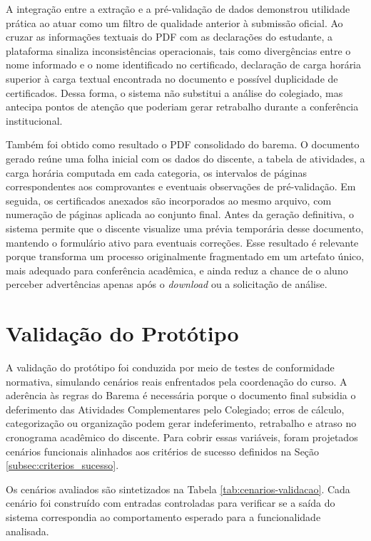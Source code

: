 A integração entre a extração e a pré-validação de dados demonstrou utilidade prática ao atuar como um filtro de qualidade anterior à submissão oficial. Ao cruzar as informações textuais do PDF com as declarações do estudante, a plataforma sinaliza inconsistências operacionais, tais como divergências entre o nome informado e o nome identificado no certificado, declaração de carga horária superior à carga textual encontrada no documento e possível duplicidade de certificados. Dessa forma, o sistema não substitui a análise do colegiado, mas antecipa pontos de atenção que poderiam gerar retrabalho durante a conferência institucional.


Também foi obtido como resultado o PDF consolidado do barema. O documento gerado reúne uma folha inicial com os dados do discente, a tabela de atividades, a carga horária computada em cada categoria, os intervalos de páginas correspondentes aos comprovantes e eventuais observações de pré-validação. Em seguida, os certificados anexados são incorporados ao mesmo arquivo, com numeração de páginas aplicada ao conjunto final. Antes da geração definitiva, o sistema permite que o discente visualize uma prévia temporária desse documento, mantendo o formulário ativo para eventuais correções. Esse resultado é relevante porque transforma um processo originalmente fragmentado em um artefato único, mais adequado para conferência acadêmica, e ainda reduz a chance de o aluno perceber advertências apenas após o \textit{download} ou a solicitação de análise.

\section{Validação do Protótipo}

A validação do protótipo foi conduzida por meio de testes de conformidade normativa, simulando cenários reais enfrentados pela coordenação do curso. A aderência às regras do Barema é necessária porque o documento final subsidia o deferimento das Atividades Complementares pelo Colegiado; erros de cálculo, categorização ou organização podem gerar indeferimento, retrabalho e atraso no cronograma acadêmico do discente. Para cobrir essas variáveis, foram projetados cenários funcionais alinhados aos critérios de sucesso definidos na Seção \ref{subsec:criterios_sucesso}.

Os cenários avaliados são sintetizados na Tabela \ref{tab:cenarios-validacao}. Cada cenário foi construído com entradas controladas para verificar se a saída do sistema correspondia ao comportamento esperado para a funcionalidade analisada.

